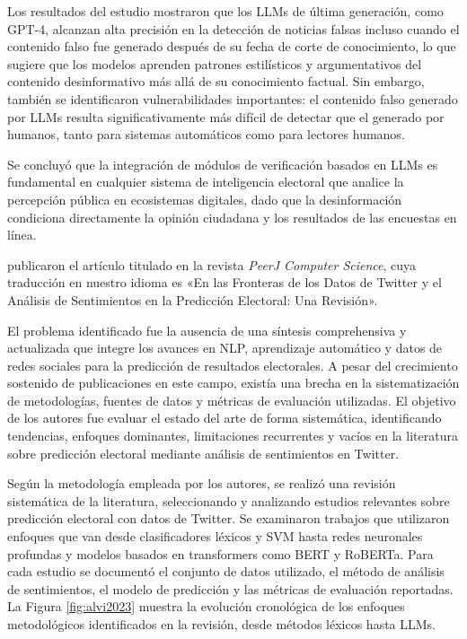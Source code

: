 \documentclass[listof=nochaptergap,12pt,times,authoryear]{report}
\let\cite\textcite
\begin{document}
Los resultados del estudio mostraron que los LLMs de última generación, como GPT-4, alcanzan alta precisión en la detección de noticias falsas incluso cuando el contenido falso fue generado después de su fecha de corte de conocimiento, lo que sugiere que los modelos aprenden patrones estilísticos y argumentativos del contenido desinformativo más allá de su conocimiento factual. Sin embargo, también se identificaron vulnerabilidades importantes: el contenido falso generado por LLMs resulta significativamente más difícil de detectar que el generado por humanos, tanto para sistemas automáticos como para lectores humanos.
 
Se concluyó que la integración de módulos de verificación basados en LLMs es fundamental en cualquier sistema de inteligencia electoral que analice la percepción pública en ecosistemas digitales, dado que la desinformación condiciona directamente la opinión ciudadana y los resultados de las encuestas en línea.
 
\cite{pr_alvi2023twitter_election_review} publicaron el artículo titulado  en la revista \textit{PeerJ Computer Science}, cuya traducción en nuestro idioma es «En las Fronteras de los Datos de Twitter y el Análisis de Sentimientos en la Predicción Electoral: Una Revisión».
 
El problema identificado fue la ausencia de una síntesis comprehensiva y actualizada que integre los avances en NLP, aprendizaje automático y datos de redes sociales para la predicción de resultados electorales. A pesar del crecimiento sostenido de publicaciones en este campo, existía una brecha en la sistematización de metodologías, fuentes de datos y métricas de evaluación utilizadas. El objetivo de los autores fue evaluar el estado del arte de forma sistemática, identificando tendencias, enfoques dominantes, limitaciones recurrentes y vacíos en la literatura sobre predicción electoral mediante análisis de sentimientos en Twitter.
 
Según la metodología empleada por los autores, se realizó una revisión sistemática de la literatura, seleccionando y analizando estudios relevantes sobre predicción electoral con datos de Twitter. Se examinaron trabajos que utilizaron enfoques que van desde clasificadores léxicos y SVM hasta redes neuronales profundas y modelos basados en transformers como BERT y RoBERTa. Para cada estudio se documentó el conjunto de datos utilizado, el método de análisis de sentimientos, el modelo de predicción y las métricas de evaluación reportadas. La Figura \ref{fig:alvi2023} muestra la evolución cronológica de los enfoques metodológicos identificados en la revisión, desde métodos léxicos hasta LLMs.
 
\end{document}
